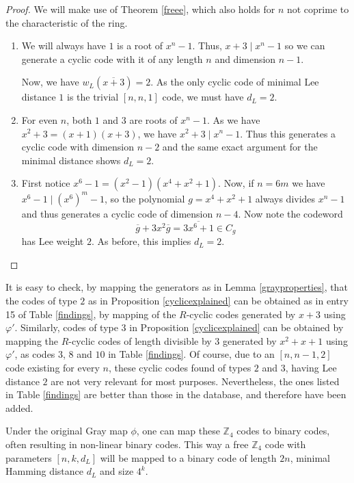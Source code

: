 \documentclass[a4paper, 12pt]{amsart}
\theoremstyle{definition}
\newcommand{\Z}{{\mathbb Z}}
\numberwithin{equation}{section}
\numberwithin{table}{section}
\begin{document}
\begin{proof}
    We will make use of Theorem \ref{freee}, which also holds for $n$ not coprime to the characteristic of the ring.

    \begin{enumerate}
        \item We will always have $1$ is a root of $x^n-1$. Thus, $x+3\mid x^n-1$ so we can generate a cyclic code with it of any length $n$ and dimension $n-1$.

        Now, we have $w_L(\overline{x+3}) = 2$. As the only cyclic code of minimal Lee distance $1$ is the trivial $[n,n,1]$ code, we must have $d_L =2$.

        \item For even $n$, both $1$ and $3$ are roots of $x^n-1$. As we have $x^2+3 = (x+1)(x+3)$, we have $x^2+3\mid x^n-1$. Thus this generates a cyclic code with dimension $n-2$ and the same exact argument for the minimal distance shows $d_L = 2$.

        \item First notice $x^6-1 =(x^2-1)(x^4+x^2+1)$. Now, if $n=6m$ we have $x^6-1\mid (x^6)^m-1$, so the polynomial $g =x^4+x^2+1$ always divides $x^n-1$ and thus generates a cyclic code of dimension $n-4$. Now note the codeword
        \[\overline g + 3x^2\overline g = \overline{3x^6+1} \in C_g\]
        has Lee weight $2$. As before, this implies $d_L = 2$.
    \end{enumerate}
\end{proof}

It is easy to check, by mapping the generators as in Lemma \ref{grayproperties}, that the codes of type $2$ as in Proposition \ref{cyclicexplained} can be obtained as in entry 15 of Table \ref{findings}, by mapping of the $R$-cyclic codes generated by $x+3$ using $\varphi'$.
Similarly, codes of type $3$ in Proposition \ref{cyclicexplained} can be obtained by mapping the $R$-cyclic codes of length divisible by $3$ generated by $x^2+x+1$ using $\varphi'$, as codes $3$, $8$ and $10$ in Table \ref{findings}.
Of course, due to an $[n,n-1,2]$ code existing for every $n$, these cyclic codes found of types $2$ and $3$, having Lee distance $2$ are not very relevant for most purposes. Nevertheless, the ones listed in Table \ref{findings} are better than those in the database, and therefore have been added.

Under the original Gray map $\phi$, one can map these $\Z_4$ codes to binary codes, often resulting in non-linear binary codes. This way a free $\Z_4$ code with parameters $[n,k,d_L]$ will be mapped to a binary code of length $2n$, minimal Hamming distance $d_L$ and size $4^k$.
\end{document}
